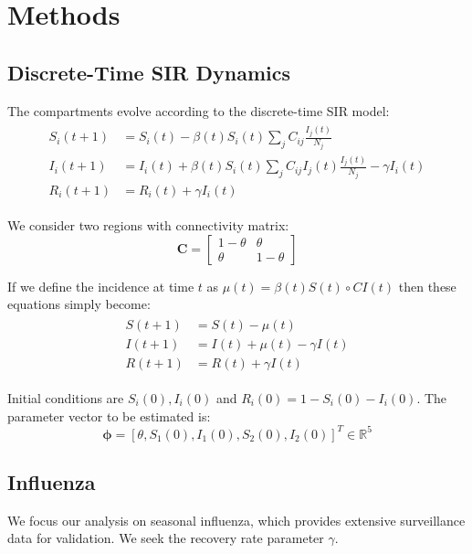 \section{Methods}
\subsection{Discrete-Time SIR Dynamics}

The compartments evolve according to the discrete-time SIR model:
\begin{align}\begin{split}%
S_i(t+1) &= S_i(t) - \beta(t) S_i(t) \sum_j C_{ij} \frac{I_j(t)}{N_j} \\
I_i(t+1) &= I_i(t) + \beta(t) S_i(t) \sum_j C_{ij} I_j(t)\frac{I_j(t)}{N_j} - \gamma I_i(t) \\
R_i(t+1) &= R_i(t) + \gamma I_i(t)
\end{split}\end{align}

We consider two regions with connectivity matrix:
\begin{equation}
\mathbf{C} = \begin{bmatrix} 1-\theta & \theta \\ \theta & 1-\theta \end{bmatrix}
\end{equation}

If we define the incidence at time $t$ as $\mu(t) = \beta(t) S(t)
\circ CI(t)$ then these equations simply become:
\begin{align}\begin{split}\label{eq:sir}
S(t+1) &= S(t) - \mu(t) \\
I(t+1) &= I(t) + \mu(t) - \gamma I(t) \\
R(t+1) &= R(t) + \gamma I(t)
\end{split}\end{align}

Initial conditions are $S_i(0), I_i(0)$ and $R_i(0) = 1 - S_i(0) -
I_i(0)$. The parameter vector to be estimated is:
\begin{equation*}
\boldsymbol{\phi} = [\theta, S_1(0), I_1(0), S_2(0), I_2(0)]^T \in \mathbb{R}^5
\end{equation*}

\subsection{Influenza}
We focus our analysis on seasonal influenza, which provides extensive
surveillance data for validation. We seek the recovery rate parameter
$\gamma$.

